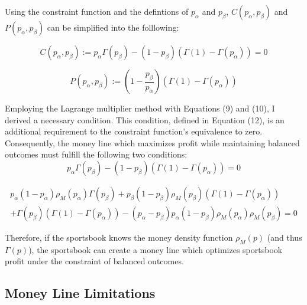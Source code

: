 \documentclass[sn-mathphys-num]{sn-jnl}
\theoremstyle{thmstyleone}%
\theoremstyle{thmstyletwo}%
\theoremstyle{thmstylethree}%
\begin{document}
Using the constraint function and the defintions of $p_\alpha$ and $p_\beta$, $C(p_\alpha,p_\beta)$ and $P(p_\alpha,p_\beta)$ can be simplified into the folllowing:

\begin{equation}
C(p_\alpha,p_\beta) := p_\alpha \Gamma(p_\beta) - (1-p_\beta)(\Gamma(1)-\Gamma(p_\alpha)) = 0
\end{equation}

\begin{equation}
P(p_\alpha,p_\beta) := (1-\frac{p_\beta}{p_\alpha})(\Gamma(1)-\Gamma(p_\alpha))
\end{equation}
\vspace{.05in}

Employing the Lagrange multiplier method with Equations (9) and (10), I derived a necessary condition. This condition, defined in Equation (12), is an additional requirement to the constraint function's equivalence to zero. Consequently, the money line which maximizes profit while maintaining balanced outcomes must fulfill the following two conditions: \\

\begin{equation}
p_\alpha \Gamma(p_\beta) - (1-p_\beta)(\Gamma(1)-\Gamma(p_\alpha))  = 0
\end{equation}

\begin{equation}
\begin{split}
p_\alpha (1-p_\alpha) \rho_M(p_\alpha) \Gamma(p_\beta) + p_\beta (1-p_\beta) \rho_M(p_\beta) (\Gamma(1)-\Gamma(p_\alpha))  \hspace{10pt}\\
+ \Gamma(p_\beta)(\Gamma(1)-\Gamma(p_\alpha)) - (p_\alpha - p_\beta) p_\alpha (1 - p_\beta) \rho_M(p_\alpha) \rho_M(p_\beta) = 0
\end{split}
\end{equation}

Therefore, if the sportsbook knows the money density function $\rho_{M}(p)$ (and thus $\Gamma(p)$), the sportsbook can create a money line which optimizes sportsbook profit under the constraint of balanced outcomes. 

\subsection{Money Line Limitations}
\end{document}
